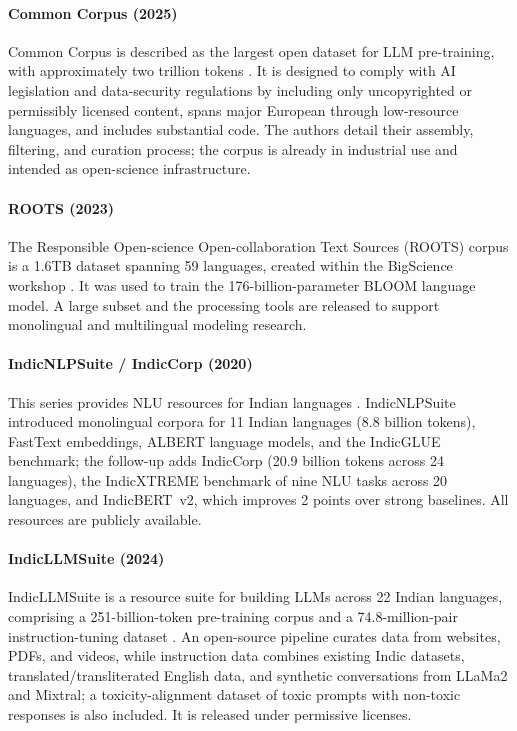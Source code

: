\documentclass[letterpaper]{article}
\begin{document}
\paragraph{Common Corpus (2025)} Common Corpus is described as the largest open dataset for LLM pre-training, with approximately two trillion tokens \citep{langlais2025commoncorpuslargestcollection}. It is designed to comply with AI legislation and data-security regulations by including only uncopyrighted or permissibly licensed content, spans major European through low-resource languages, and includes substantial code. The authors detail their assembly, filtering, and curation process; the corpus is already in industrial use and intended as open-science infrastructure.

\paragraph{ROOTS (2023)} The Responsible Open-science Open-collaboration Text Sources (ROOTS) corpus is a 1.6TB dataset spanning 59 languages, created within the BigScience workshop \citep{laurençon2023bigsciencerootscorpus16tb}. It was used to train the 176-billion-parameter BLOOM language model. A large subset and the processing tools are released to support monolingual and multilingual modeling research.

\paragraph{IndicNLPSuite / IndicCorp (2020)} This series provides NLU resources for Indian languages \citep{kakwani-etal-2020-indicnlpsuite,doddapaneni2023leavingindiclanguagebehind}. IndicNLPSuite introduced monolingual corpora for 11 Indian languages (8.8 billion tokens), FastText embeddings, ALBERT language models, and the IndicGLUE benchmark; the follow-up adds IndicCorp (20.9 billion tokens across 24 languages), the IndicXTREME benchmark of nine NLU tasks across 20 languages, and IndicBERT~v2, which improves 2 points over strong baselines. All resources are publicly available.

\paragraph{IndicLLMSuite (2024)} IndicLLMSuite is a resource suite for building LLMs across 22 Indian languages, comprising a 251-billion-token pre-training corpus and a 74.8-million-pair instruction-tuning dataset \citep{Khan_2024}. An open-source pipeline curates data from websites, PDFs, and videos, while instruction data combines existing Indic datasets, translated/transliterated English data, and synthetic conversations from LLaMa2 and Mixtral; a toxicity-alignment dataset of toxic prompts with non-toxic responses is also included. It is released under permissive licenses.
\end{document}
